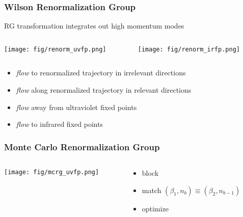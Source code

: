 \documentclass{beamer}
\begin{document}
  \begin{frame}
    \frametitle{Wilson Renormalization Group}
    RG transformation integrates out high momentum modes
    \begin{columns}[T]
      \begin{column}{.5\textwidth}
        \begin{block}{}
          \texttt{[image: fig/renorm\_uvfp.png]}
        \end{block}
      \end{column}
      \begin{column}{.5\textwidth}
        \begin{block}{}
          \texttt{[image: fig/renorm\_irfp.png]}
        \end{block}
      \end{column}
    \end{columns}
    \begin{itemize}
      \item \emph{\textcolor{flow}{flow}} to \textcolor{renorm_traj}{renormalized trajectory} in irrelevant directions
      \item \emph{\textcolor{flow}{flow}} along \textcolor{renorm_traj}{renormalized trajectory} in relevant directions
      \item \emph{\textcolor{flow}{flow}} away from \textcolor{uvfp}{ultraviolet fixed points}
      \item \emph{\textcolor{flow}{flow}} to \textcolor{irfp}{infrared fixed points}
    \end{itemize}
  \end{frame}

  \begin{frame}
    \frametitle{Monte Carlo Renormalization Group}
    \begin{columns}[T]
      \begin{column}{.5\textwidth}
        \begin{block}{}
          \texttt{[image: fig/mcrg\_uvfp.png]}
        \end{block}
      \end{column}
      \begin{column}{.5\textwidth}
        \begin{block}{}
          \begin{itemize}
            \item block
            \item match $(\beta_1,n_b)\equiv(\beta_2,n_{b-1})$
            \item optimize
          \end{itemize}
        \end{block}
      \end{column}
    \end{columns}
  \end{frame}
\end{document}
